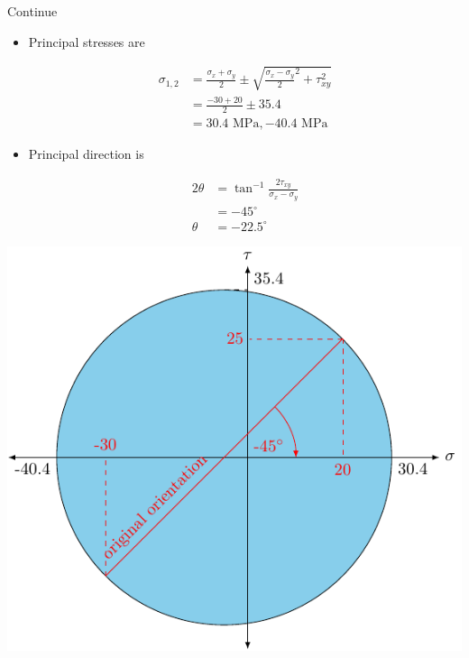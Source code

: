 \documentclass[10pt, svgnames]{beamer}
\begin{document}
\begin{frame}[label={sec:orgc737f95}]{Continue}
\begin{itemize}
\item Principal stresses are

\begin{align*}
  \sigma_{1,2} &= \frac{\sigma_x + \sigma _y}{2} \pm \sqrt {\frac{\sigma _x - \sigma_y}{2}^2 + \tau _{xy}^2}  \\
               &= \frac{-30 + 20}{2} \pm 35.4 \\
               &= 30.4 \text{ MPa}, - 40.4 \text{ MPa}
\end{align*}

\item Principal direction is

\begin{align*}
  2\theta  &= \tan^{-1}\frac{2\tau_{xy}}{\sigma_x - \sigma_y} \\
           &= -45^{\circ} \\
  \theta &= -22.5^{\circ}
\end{align*}
\end{itemize}
\end{frame}

\begin{frame}[label={sec:org0017a3a}]{}
\begin{center}
\includegraphics[width=.9\linewidth]{pictures/example-I-mohrs.pdf}
\end{center}
\end{frame}
\end{document}
